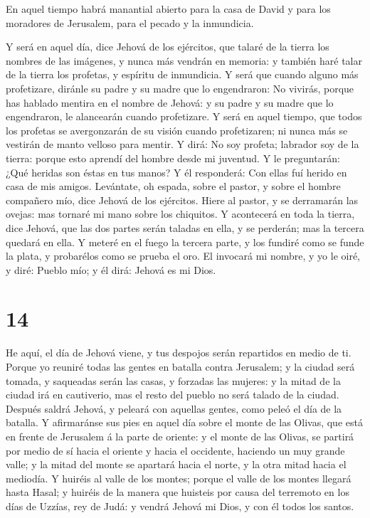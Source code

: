  En aquel tiempo habrá manantial abierto para la casa de
David y para los moradores de Jerusalem, para el pecado y la inmundicia.

 Y será en aquel día, dice Jehová de los ejércitos, que
talaré de la tierra los nombres de las imágenes, y nunca más vendrán en
memoria: y también haré talar de la tierra los profetas, y espíritu de
inmundicia.  Y será que cuando alguno más profetizare,
diránle su padre y su madre que lo engendraron: No vivirás, porque has
hablado mentira en el nombre de Jehová: y su padre y su madre que lo
engendraron, le alancearán cuando profetizare.  Y será en
aquel tiempo, que todos los profetas se avergonzarán de su visión cuando
profetizaren; ni nunca más se vestirán de manto velloso para mentir.
 Y dirá: No soy profeta; labrador soy de la tierra: porque
esto aprendí del hombre desde mi juventud.  Y le
preguntarán: ¿Qué heridas son éstas en tus manos? Y él responderá: Con
ellas fuí herido en casa de mis amigos.  Levántate, oh
espada, sobre el pastor, y sobre el hombre compañero mío, dice Jehová de
los ejércitos. Hiere al pastor, y se derramarán las ovejas: mas tornaré
mi mano sobre los chiquitos.  Y acontecerá en toda la
tierra, dice Jehová, que las dos partes serán taladas en ella, y se
perderán; mas la tercera quedará en ella.  Y meteré en el
fuego la tercera parte, y los fundiré como se funde la plata, y
probarélos como se prueba el oro. El invocará mi nombre, y yo le oiré, y
diré: Pueblo mío; y él dirá: Jehová es mi Dios.

\hypertarget{section-13}{%
\section{14}\label{section-13}}

 He aquí, el día de Jehová viene, y tus despojos serán
repartidos en medio de ti.  Porque yo reuniré todas las
gentes en batalla contra Jerusalem; y la ciudad será tomada, y saqueadas
serán las casas, y forzadas las mujeres: y la mitad de la ciudad irá en
cautiverio, mas el resto del pueblo no será talado de la ciudad.
 Después saldrá Jehová, y peleará con aquellas gentes, como
peleó el día de la batalla.  Y afirmaránse sus pies en aquel
día sobre el monte de las Olivas, que está en frente de Jerusalem á la
parte de oriente: y el monte de las Olivas, se partirá por medio de sí
hacia el oriente y hacia el occidente, haciendo un muy grande valle; y
la mitad del monte se apartará hacia el norte, y la otra mitad hacia el
mediodía.  Y huiréis al valle de los montes; porque el valle
de los montes llegará hasta Hasal; y huiréis de la manera que huisteis
por causa del terremoto en los días de Uzzías, rey de Judá: y vendrá
Jehová mi Dios, y con él todos los santos.

